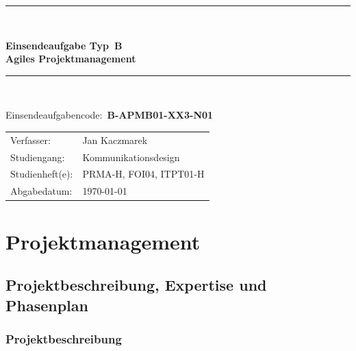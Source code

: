 \documentclass[
    a4paper,
    11pt,
    bibliography=totoc,
    listof=totoc,
    parskip=half,
    headings=normal
]{scrbook}
\begin{document}
\frontmatter

\begin{titlepage}
      \centering
      \vspace*{4cm}
      \rule{\linewidth}{0.4pt}\\[0.4cm]
      {\LARGE\bfseries Einsendeaufgabe Typ~B\\[0.3cm]
      Agiles Projektmanagement\par}
      \rule{\linewidth}{0.4pt}\\[1.5cm]
      {\large Einsendeaufgabencode:~\textbf{B-APMB01-XX3-N01}\par}
      \vspace{1cm}
      \begin{tabular}{ll}
            Verfasser:      & Jan Kaczmarek           \\
            Studiengang:    & Kommunikationsdesign    \\
            Studienheft(e): & PRMA-H, FOI04, ITPT01-H \\
            Abgabedatum:    & \today                  \\
      \end{tabular}
      \vfill
\end{titlepage}

\tableofcontents

\mainmatter

\chapter{Projektmanagement}

\section{Projektbeschreibung, Expertise und Phasenplan}

\subsection{Projektbeschreibung}
\end{document}
